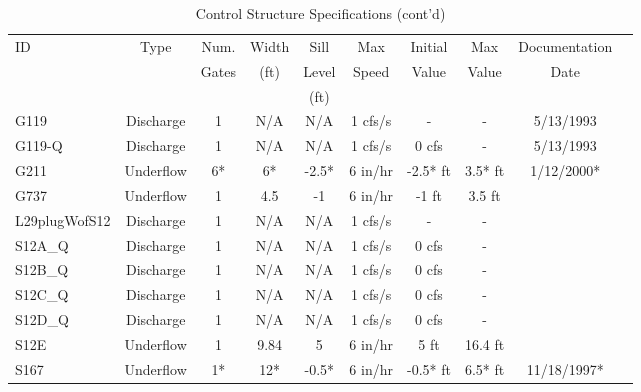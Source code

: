 \scriptsize
\begin{table}[h]
\caption{Control Structure Specifications (cont'd)}
\label{tab:struc-specs2}
\begin{tabular}{@{}lccccccccc@{}}
\toprule
{ID}            & {Type}        & Num.     & Width       & Sill         & Max         & Initial         & Max     & Documentation  \\
                &               & Gates    & (ft)        & Level        & Speed       & Value           & Value   & Date           \\
                &               &          &             & (ft)         &             &                 &         &                \\
\hline
{G119}          & Discharge     & 1        & N/A         & N/A          & 1 cfs/s        & -               & -       & 5/13/1993       \\
{G119-Q}        & Discharge     & 1        & N/A         & N/A          & 1 cfs/s        & 0 cfs           & -       & 5/13/1993       \\
{G211}          & Underflow     & 6*       & 6*          & -2.5*        & 6 in/hr        & -2.5* ft        & 3.5* ft & 1/12/2000*      \\
{G737}          & Underflow     & 1        & 4.5         & -1           & 6 in/hr        & -1 ft           & 3.5 ft  &                 \\
{L29plugWofS12} & Discharge     & 1        & N/A         & N/A          & 1 cfs/s        & -               & -       &                 \\
{S12A\_Q}       & Discharge     & 1        & N/A         & N/A          & 1 cfs/s        & 0 cfs           & -       &                 \\
{S12B\_Q}       & Discharge     & 1        & N/A         & N/A          & 1 cfs/s        & 0 cfs           & -       &                 \\
{S12C\_Q}       & Discharge     & 1        & N/A         & N/A          & 1 cfs/s        & 0 cfs           & -       &                 \\
{S12D\_Q}       & Discharge     & 1        & N/A         & N/A          & 1 cfs/s        & 0 cfs           & -       &                 \\
{S12E}          & Underflow     & 1        & 9.84        & 5            & 6 in/hr        & 5 ft            & 16.4 ft &                 \\
{S167}          & Underflow     & 1*       & 12*         & -0.5*        & 6 in/hr        & -0.5* ft        & 6.5* ft & 11/18/1997*     \\

\end{tabular}
\end{table}
